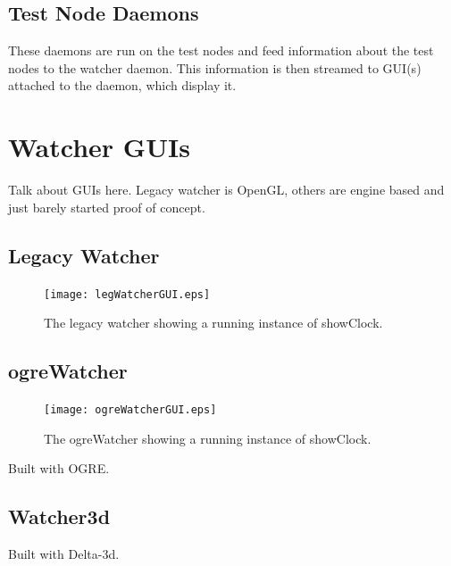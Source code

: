 \documentclass{article}
\begin{document}
\subsection{Test Node Daemons}
These daemons are run on the test nodes and feed information about the test nodes to the watcher daemon. This information is then streamed to GUI(s) attached to the daemon, which display it.





\section{Watcher GUIs}

Talk about GUIs here. Legacy watcher is OpenGL, others are engine based and just barely started proof of concept.

\subsection{Legacy Watcher}
\label{LegacyWatcher}
\begin{figure}[here]
\centering
\texttt{[image: legWatcherGUI.eps]}
\caption{The legacy watcher showing a running instance of showClock.}
\label{fig:LegacyWatcherClock}
\end{figure}

\subsection{ogreWatcher}
\begin{figure}
\centering
\texttt{[image: ogreWatcherGUI.eps]}
\caption{The ogreWatcher showing a running instance of showClock.}
\label{ogreWatcher}
\end{figure}

Built with OGRE.
\subsection{Watcher3d}
Built with Delta-3d.

\printindex
\end{document}
